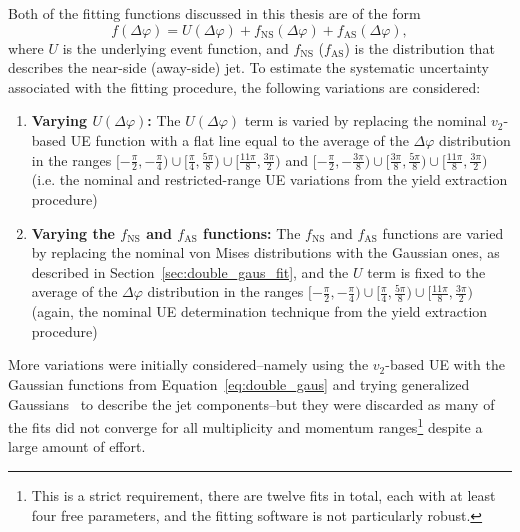 Both of the fitting functions discussed in this thesis are of the form
%
\begin{equation}
    \label{eq:fit_function_form}
    f(\Delta\varphi) = U(\Delta\varphi) + f_{\text{NS}}(\Delta\varphi) + f_{\text{AS}}(\Delta\varphi),
\end{equation}
%
where $U$ is the underlying event function, and $f_{\text{NS}}$ ($f_{\text{AS}}$) is the distribution that describes the near-side (away-side) jet. To estimate the systematic uncertainty associated with the fitting procedure, the following variations are considered:
%
\begin{enumerate}
    \item \textbf{Varying $U(\Delta\varphi)$:} The $U(\Delta\varphi)$ term is varied by replacing the nominal $v_{2}$-based UE function with a flat line equal to the average of the $\Delta\varphi$ distribution in the ranges $[-\frac{\pi}{2}, -\frac{\pi}{4}) \cup [\frac{\pi}{4}, \frac{5\pi}{8}) \cup [\frac{11\pi}{8}, \frac{3\pi}{2})$ and $[-\frac{\pi}{2}, -\frac{3\pi}{8}) \cup [\frac{3\pi}{8}, \frac{5\pi}{8}) \cup [\frac{11\pi}{8}, \frac{3\pi}{2})$ (i.e. the nominal and restricted-range UE variations from the yield extraction procedure)
    \item \textbf{Varying the $f_{\text{NS}}$ and $f_{\text{AS}}$ functions:} The $f_{\text{NS}}$ and $f_{\text{AS}}$ functions are varied by replacing the nominal von Mises distributions with the Gaussian ones, as described in Section~\ref{sec:double_gaus_fit}, and the $U$ term is fixed to the average of the $\Delta\varphi$ distribution in the ranges $[-\frac{\pi}{2}, -\frac{\pi}{4}) \cup [\frac{\pi}{4}, \frac{5\pi}{8}) \cup [\frac{11\pi}{8}, \frac{3\pi}{2})$ (again, the nominal UE determination technique from the yield extraction procedure)
\end{enumerate}
%
More variations were initially considered--namely using the $v_{2}$-based UE with the Gaussian functions from Equation~\ref{eq:double_gaus} and trying generalized Gaussians~\cite{GeneralizedGaus} to describe the jet components--but they were discarded as many of the fits did not converge for all multiplicity and momentum ranges\footnote{This is a strict requirement, there are twelve fits in total, each with at least four free parameters, and the fitting software is not particularly robust.} despite a large amount of effort.


